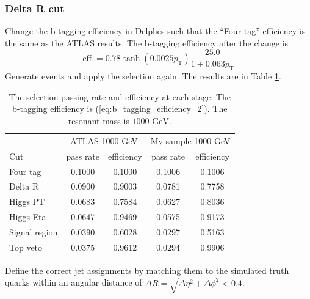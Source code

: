 \documentclass[12pt]{article}
\begin{document}
		\subsubsection{Delta R cut}%
		\label{subs:delta_r_cut}
			Change the b-tagging efficiency in Delphes such that the ``Four tag'' efficiency is the same as the ATLAS results. The b-tagging efficiency after the change is
			\begin{equation}\label{eq:b_tagging_efficiency_2}
				\text{eff.} = 0.78 \tanh(0.0025p_\text{T}) \frac{25.0}{1+0.063p_\text{T}}		
			\end{equation}
			Generate events and apply the selection again. The results are in Table \ref{tab:signal_selection_efficiency_1000GeV_change_btag}.
			\begin{table}[htpb]
				\centering
				\caption{The selection passing rate and efficiency at each stage. The b-tagging efficiency is (\ref{eq:b_tagging_efficiency_2}). The resonant mass is $\text{1000 GeV}$.}
				\label{tab:signal_selection_efficiency_1000GeV_change_btag}
				\begin{tabular}{l|cc|cc}
								  & \multicolumn{2}{|c|}{ATLAS 1000 GeV} & \multicolumn{2}{|c}{My sample 1000 GeV} \\
					Cut           & pass rate       & efficiency       & pass rate         & efficiency         \\ \hline
					Four tag      & 0.1000 & 0.1000 & 0.1006 & 0.1006 \\
					Delta R       & 0.0900 & 0.9003 & 0.0781 & 0.7758 \\
					Higgs PT      & 0.0683 & 0.7584 & 0.0627 & 0.8036 \\
					Higgs Eta     & 0.0647 & 0.9469 & 0.0575 & 0.9173 \\
					Signal region & 0.0390 & 0.6028 & 0.0297 & 0.5163 \\
					Top veto      & 0.0375 & 0.9612 & 0.0294 & 0.9906      
				\end{tabular}
			\end{table}
			
			Define the correct jet assignments by matching them to the simulated truth quarks within an angular distance of $\Delta R = \sqrt{\Delta\eta^2 + \Delta\phi^2}<0.4$.
\end{document}
